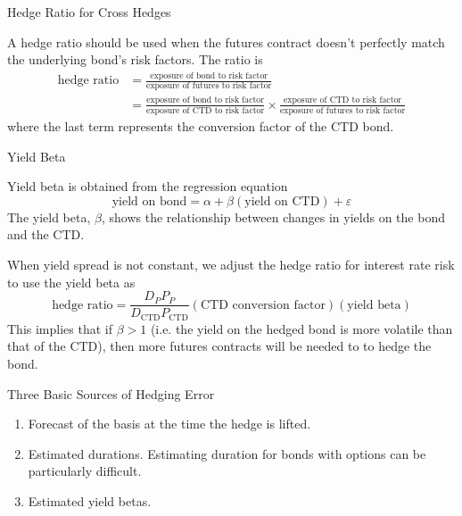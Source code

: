 \documentclass[../custom]{flashcards}
\begin{document}
\begin{flashcard}{Hedge Ratio for Cross Hedges}
    \begin{flushleft}
        A hedge ratio should be used when the futures contract doesn't perfectly match the underlying bond's risk factors. The ratio is
        \begin{align*}
            \text{hedge ratio} &= \frac{\text{exposure of bond to risk factor}}{\text{exposure of futures to risk factor}} \\
            &= \frac{\text{exposure of bond to risk factor}}{\text{exposure of CTD to risk factor}} \times \frac{\text{exposure of CTD to risk factor}}{\text{exposure of futures to risk factor}}
        \end{align*}
        where the last term represents the conversion factor of the CTD bond.
    \end{flushleft}
\end{flashcard}

\begin{flashcard}{Yield Beta}
    \begin{flushleft}
        Yield beta is obtained from the regression equation
        \[
            \text{yield on bond} = \alpha + \beta (\text{yield on CTD}) + \varepsilon
        \]
        The yield beta, $\beta$, shows the relationship between changes in yields on the bond and the CTD.\newline

        When yield spread is not constant, we adjust the hedge ratio for interest rate risk to use the yield beta as
        \[
            \text{hedge ratio} = \frac{D_P P_P}{D_{\text{CTD}} P_{\text{CTD}}} (\text{CTD conversion factor}) (\text{yield beta})
        \]
        This implies that if $\beta > 1$ (i.e. the yield on the hedged bond is more volatile than that of the CTD), then more futures contracts will be needed to to hedge the bond.
    \end{flushleft}
\end{flashcard}

\begin{flashcard}{Three Basic Sources of Hedging Error}
    \begin{enumerate}
        \item Forecast of the basis at the time the hedge is lifted.
        \item Estimated durations. Estimating duration for bonds with options can be particularly difficult.
        \item Estimated yield betas.
    \end{enumerate}
\end{flashcard}
\end{document}
